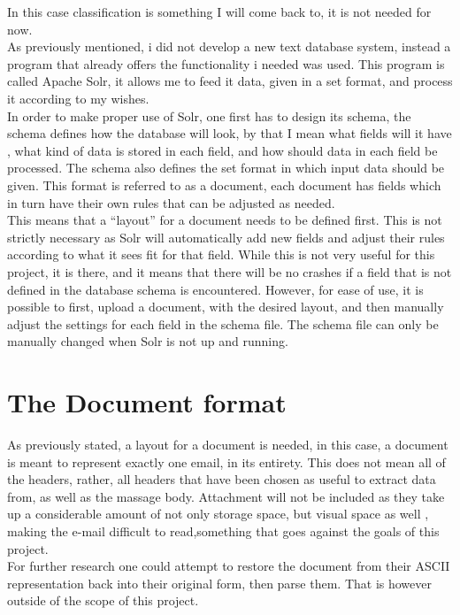 \documentclass{report}
\begin{document}
In this case classification is something I will come back to, it is not needed for now.\\

As previously mentioned, i did not develop a new text database system, instead a program that already offers the functionality i needed was used. This program is called Apache Solr, it allows me to feed it data, given in a set format, and process it according to my wishes.  \\

In order to make proper use of Solr, one first has to design its schema, the schema defines how the database will look, by that I mean what fields will it have , what kind of data is stored in each field, and how should data in each field be processed. The schema also defines the set format in which input data should be given. This format is referred to as a document, each document has fields which in turn have their own rules that can be adjusted as needed.\\

This means that a “layout” for a document needs to be defined first. This is not strictly necessary as Solr will automatically add new fields and adjust their rules according to what it sees fit for that field. While this is not very useful for this project, it is there, and it means that there will be no crashes if a field that is not defined in the database schema is encountered. However, for ease of use, it is possible to first, upload a document, with the desired layout, and then manually adjust the settings for each field  in the schema file. The schema file can only be manually changed when Solr is not up and running.

\section{The Document format}

As previously stated, a layout for a document is needed, in this case, a document is meant to represent exactly one email, in its entirety. This does not mean all of the headers, rather, all headers that have been chosen as useful to extract data from, as well as the massage body. Attachment will not be included as they take up a considerable amount of not only storage space,  but visual space as well , making the e-mail difficult to read,something that goes against the goals of this project. \\

For further research one could attempt to restore the document from their ASCII representation back into their original form, then parse them. That is however outside of the scope of this project.\\
\end{document}
